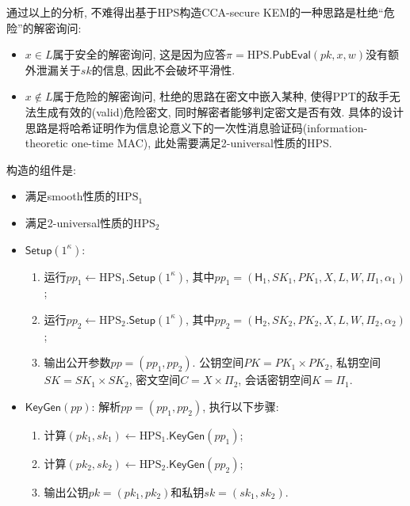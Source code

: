 通过以上的分析, 不难得出基于HPS构造CCA-secure KEM的一种思路是杜绝``危险''的解密询问: 
\begin{itemize}
    \item $x \in L$属于安全的解密询问, 这是因为应答$\pi = \text{HPS}.\mathsf{PubEval}(pk, x, w)$没有额外泄漏关于$sk$的信息, 
        因此不会破坏平滑性.        
    
    \item $x \notin L$属于危险的解密询问, 杜绝的思路在密文中嵌入某种, 使得PPT的敌手无法生成有效的(valid)危险密文, 
        同时解密者能够判定密文是否有效. 
        具体的设计思路是将哈希证明作为信息论意义下的一次性消息验证码(information-theoretic one-time MAC), 此处需要满足2-universal性质的HPS.
\end{itemize}

\begin{construction}\label{construction:CCA-KEM-from-HPS}
构造的组件是: 
\begin{itemize}
    \item 满足smooth性质的$\text{HPS}_1$
    \item 满足2-universal性质的$\text{HPS}_2$
\end{itemize}

\begin{itemize}
\item $\mathsf{Setup}(1^\kappa)$:  
    \begin{enumerate}
        \item 运行$pp_1 \leftarrow \text{HPS}_1.\mathsf{Setup}(1^\kappa)$, 
            其中$pp_1 = (\mathsf{H}_1, SK_1, PK_1, X, L, W, \Pi_1, \alpha_1)$; 
        \item 运行$pp_2 \leftarrow \text{HPS}_2.\mathsf{Setup}(1^\kappa)$, 
            其中$pp_2 = (\mathsf{H}_2, SK_2, PK_2, X, L, W, \Pi_2, \alpha_2)$; 
        \item 输出公开参数$pp = (pp_1, pp_2)$. 
            公钥空间$PK = PK_1 \times PK_2$, 
            私钥空间$SK = SK_1 \times SK_2$, 密文空间$C = X \times \Pi_2$, 会话密钥空间$K = \Pi_1$. 
    \end{enumerate}

\item $\mathsf{KeyGen}(pp)$: 解析$pp = (pp_1, pp_2)$, 执行以下步骤:
    \begin{enumerate}
        \item 计算$(pk_1, sk_1) \leftarrow \text{HPS}_1.\mathsf{KeyGen}(pp_1)$;
        \item 计算$(pk_2, sk_2) \leftarrow \text{HPS}_2.\mathsf{KeyGen}(pp_2)$;
        \item 输出公钥$pk = (pk_1, pk_2)$和私钥$sk = (sk_1, sk_2)$. 
    \end{enumerate}


\end{itemize}
\end{construction}
